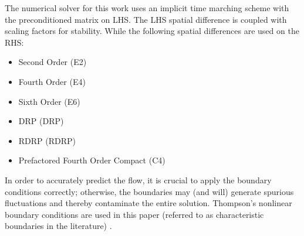 \documentclass[conf]{new-aiaa}
\begin{document}
The numerical solver for this work uses an implicit time marching scheme with
the preconditioned matrix on LHS. 
The LHS spatial difference is coupled with scaling factors for stability. 
While the following spatial differences are used on the RHS:
\begin{itemize}
	\item Second Order (E2)
	\item Fourth Order (E4)
	\item Sixth Order (E6)
	\item DRP  (DRP)
	\item RDRP  (RDRP)
	\item Prefactored Fourth Order Compact (C4)
\end{itemize}
In order to accurately predict the flow, it is crucial to apply the boundary conditions correctly; otherwise, the boundaries may (and will) generate spurious fluctuations and thereby contaminate the entire solution. 
Thompson's nonlinear boundary conditions are used in this paper (referred to as characteristic boundaries in the literature) \cite{Thompson1, Thompson2}.  
\end{document}
